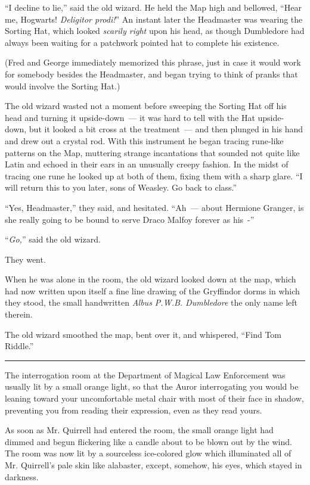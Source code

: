 ``I decline to lie,'' said the old wizard. He held the Map high and bellowed, ``Hear me, Hogwarts! \emph{Deligitor prodi!}'' An instant later the Headmaster was wearing the Sorting Hat, which looked \emph{scarily right} upon his head, as though Dumbledore had always been waiting for a patchwork pointed hat to complete his existence.

(Fred and George immediately memorized this phrase, just in case it would work for somebody besides the Headmaster, and began trying to think of pranks that would involve the Sorting Hat.)

The old wizard wasted not a moment before sweeping the Sorting Hat off his head and turning it upside-down~--- it was hard to tell with the Hat upside-down, but it looked a bit cross at the treatment~--- and then plunged in his hand and drew out a crystal rod. With this instrument he began tracing rune-like patterns on the Map, muttering strange incantations that sounded not quite like Latin and echoed in their ears in an unusually creepy fashion. In the midst of tracing one rune he looked up at both of them, fixing them with a sharp glare. ``I will return this to you later, sons of Weasley. Go back to class.''

``Yes, Headmaster,'' they said, and hesitated. ``Ah~--- about Hermione Granger, is she really going to be bound to serve Draco Malfoy forever as his~-''

``\emph{Go,}'' said the old wizard.

They went.

When he was alone in the room, the old wizard looked down at the map, which had now written upon itself a fine line drawing of the Gryffindor dorms in which they stood, the small handwritten \emph{Albus P.W.B. Dumbledore} the only name left therein.

The old wizard smoothed the map, bent over it, and whispered, ``Find Tom Riddle.''

\begin{center}\rule{3in}{0.4pt}\end{center}

The interrogation room at the Department of Magical Law Enforcement was usually lit by a small orange light, so that the Auror interrogating you would be leaning toward your uncomfortable metal chair with most of their face in shadow, preventing you from reading their expression, even as they read yours.

As soon as Mr. Quirrell had entered the room, the small orange light had dimmed and begun flickering like a candle about to be blown out by the wind. The room was now lit by a sourceless ice-colored glow which illuminated all of Mr. Quirrell's pale skin like alabaster, except, somehow, his eyes, which stayed in darkness.

